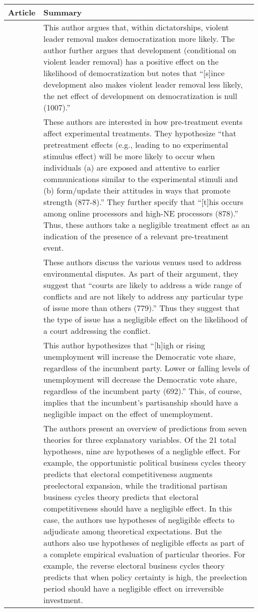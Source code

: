 \documentclass[12pt]{article}
\begin{document}
\begin{center}
\begin{longtable}{p{5cm} p{10cm}}
\hline 
Article & Summary \\ 
\hline
\cite{Miller2012} & This author argues that, within dictatorships, violent leader removal makes democratization more likely. The author further argues that development (conditional on violent leader removal) has a positive effect on the likelihood of democratization but notes that ``[s]ince development also makes violent leader removal less likely, the net effect of development on democratization is null (1007).''\\
\hline
\cite{Druckman2012} & These authors are interested in how pre-treatment events affect experimental treatments. They hypothesize ``that pretreatment effects (e.g., leading to no experimental stimulus effect) will be more likely to occur when individuals (a) are exposed and attentive to earlier communications similar to the experimental stimuli and (b) form/update their attitudes in ways that promote strength (877-8).'' They further specify that  ``[t]his occurs among online processors and high-NE processors (878).'' Thus, these authors take a negligible treatment effect as an indication of the presence of a relevant pre-treatment event.\\
\hline
\cite{Heikkila2012} & These authors discuss the various venues used to address environmental disputes. As part of their argument, they suggest that ``courts are likely to address a wide range of conflicts and are not likely to address any particular type of issue more than others (779).'' Thus they suggest that the type of issue has a negligible effect on the likelihood of a court addressing the conflict.\\
\hline
\cite{Wright2012} & This author hypothesizes that ``[h]igh or rising unemployment will increase the Democratic vote share, regardless of the incumbent party. Lower or falling levels of unemployment will decrease the Democratic vote share, regardless of the incumbent party (692).'' This, of course, implies that the incumbent's partisanship should have a negligible impact on the effect of unemployment.\\
 \hline
\cite{Canes-Wrone2012} & The authors present an overview of predictions from seven theories for three explanatory variables. Of the 21 total hypotheses, nine are hypotheses of a negligble effect. For example, the opportunistic political business cycles theory predicts that electoral competitiveness augments preelectoral expansion, while the traditional partisan business cycles theory predicts that electoral competitiveness should have a negligible effect. In this case, the authors use hypotheses of negligible effects to adjudicate among theoretical expectations. But the authors also use hypotheses of negligible effects as part of a complete empirical evaluation of particular theories. For example, the reverse electoral business cycles theory predicts that when policy certainty is high, the preelection period should have a negligible effect on irreversible investment.\\ 

\end{longtable}
\end{center}
\end{document}
